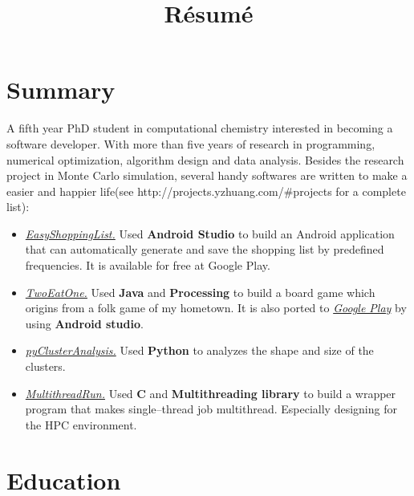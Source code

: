 \documentclass[letter]{moderncv}
\title{R\'{e}sum\'{e}}
\begin{document}
\makecvtitle
\vspace*{-20mm}
\section{Summary}
A fifth year PhD student in computational chemistry interested in becoming a software developer. With more than five years of research in programming, numerical optimization, algorithm design and data analysis. Besides the research project in Monte Carlo simulation, several handy softwares are written to make a easier and happier life(see http://projects.yzhuang.com/\#projects for a complete list):
\begin{itemize}
\item \textit{\href{https://play.google.com/store/apps/details?id=com.yzhuang.easyshoppinglist}{EasyShoppingList.}} Used \textbf{Android Studio} to build an Android application that can automatically generate and save the shopping list by predefined frequencies. It is available for free at Google Play.
\item
  \textit{\href{https://github.com/zhuangqdcn/TwoEatOne-NoAI}{TwoEatOne.}}
  Used \textbf{Java} and \textbf{Processing} to build a board game which origins from a folk game of my
  hometown. It is also ported to \textit{\href{https://play.google.com/store/apps/details?id=com.yzhuang.twoeatoneandroid}{Google Play}} by using \textbf{Android studio}.
\item \textit{\href{https://github.com/zhuangqdcn/pyClusterAnalysis}{pyClusterAnalysis.}} Used \textbf{Python} to analyzes the shape and size of the clusters.
\item \textit{\href{https://github.com/zhuangqdcn/MultithreadRun}{MultithreadRun.}} Used \textbf{C} and \textbf{Multithreading library} to build a wrapper program that makes single--thread job multithread. Especially designing for the HPC environment.
\end{itemize}
\vspace*{-2mm}
\section{Education}
\vspace*{-2mm}
\end{document}
